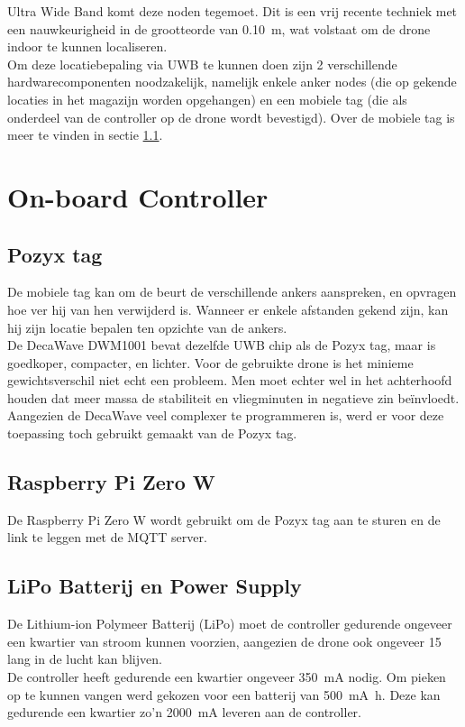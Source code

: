 Ultra Wide Band komt deze noden tegemoet. Dit is een vrij recente techniek met een nauwkeurigheid in de grootteorde van \SI{0.10}{\m}, wat volstaat om de drone indoor te kunnen localiseren.\\

Om deze locatiebepaling via UWB te kunnen doen zijn 2 verschillende hardwarecomponenten noodzakelijk, namelijk enkele anker nodes (die op gekende locaties in het magazijn worden opgehangen) en een mobiele tag (die als onderdeel van de controller op de drone wordt bevestigd). Over de mobiele tag is meer te vinden in sectie \ref{sec:pozyx_tag}.

\section{On-board Controller} \label{sec:onboard_controller}
\subsection{Pozyx tag}  \label{sec:pozyx_tag}
De mobiele tag kan om de beurt de verschillende ankers aanspreken, en opvragen hoe ver hij van hen verwijderd is. Wanneer er enkele afstanden gekend zijn, kan hij zijn locatie bepalen ten opzichte van de ankers.\\

De DecaWave DWM1001 bevat dezelfde UWB chip als de Pozyx tag, maar is goedkoper, compacter, en lichter. Voor de gebruikte drone is het minieme gewichtsverschil niet echt een probleem. Men moet echter wel in het achterhoofd houden dat meer massa de stabiliteit en vliegminuten in negatieve zin be\"invloedt.\\
Aangezien de DecaWave veel complexer te programmeren is, werd er voor deze toepassing toch gebruikt gemaakt van de Pozyx tag.

\subsection{Raspberry Pi Zero W} \label{sec:raspberry_pi}
De Raspberry Pi Zero W wordt gebruikt om de Pozyx tag aan te sturen en de link te leggen met de MQTT server.

\subsection{LiPo Batterij en Power Supply} \label{sec:lipo}
De Lithium-ion Polymeer Batterij (LiPo) moet de controller gedurende ongeveer een kwartier van stroom kunnen voorzien, aangezien de drone ook ongeveer \SI{15}{\min} lang in de lucht kan blijven.\\
De controller heeft gedurende een kwartier ongeveer \SI{350}{\mA} nodig. Om pieken op te kunnen vangen werd gekozen voor een batterij van \SI{500}{\mA\hour}. Deze kan gedurende een kwartier zo'n \SI{2000}{\mA} leveren aan de controller.\\

